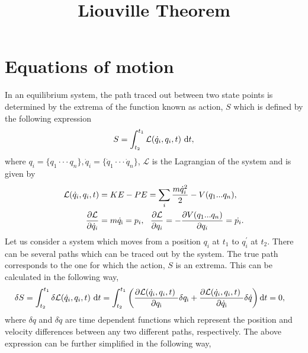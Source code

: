 \documentclass[a4paper]{article}
\title{Liouville Theorem}
\date{}
\begin{document}
\maketitle
\section{Equations of motion}
In an equilibrium system, the path traced out between two state points is determined by the extrema of the function known as action, $S$ which is defined by the following expression
\begin{equation}
S=\int^{t_{1}}_{t_{2}}\mathcal{L}(\dot{q}_{i},q_{i},t)~{\rm d}t,
\end{equation}
where $q_{i}=\{q_{1}\cdot\cdot\cdot q_{n}\},\dot{q}_{i}=\{\dot{q}_{1}\cdot\cdot\cdot \dot{q}_{n}\}$, $\mathcal{L}$ is the Lagrangian of the system and is given by
\begin{equation}\label{eq:lagrangian}
\begin{split}
\mathcal{L}(\dot{q}_{i},q_{i},t)&=KE-PE=\sum_{i}\frac{m\dot{q}_{i}^{2}}{2} - V(q_{1}...q_{n}),\\
\frac{\partial \mathcal{L}}{\partial \dot{q}_{i}}&=m\dot{q}_{\rm i}=p_{i},~~\frac{\partial \mathcal{L}}{\partial q_{i}}=-\frac{\partial V(q_{1}...q_{n})}{\partial q_{i}}=\dot{p_{i}}.
\end{split}
\end{equation}
Let us consider a system which moves from a position $q_{i}$ at $t_{1}$ to $q_{i}^{\prime}$ at $t_{2}$. There can be several paths which can be traced out by the system. The true path corresponds to the one for which the action, $S$ is an extrema. This can be calculated in the following way,
\begin{equation}
\begin{split}
\delta S&=\int^{t_{1}}_{t_{2}}\delta\mathcal{L}(\dot{q}_{i},q_{i},t)~{\rm d}t=\int^{t_{1}}_{t_{2}}\left(\frac{\partial\mathcal{L}(\dot{q}_{i},q_{i},t)~}{\partial q_{\rm i}}\delta q_{\rm i}+\frac{\partial\mathcal{L}(\dot{q}_{i},q_{i},t)~}{\partial \dot{q}_{\rm i}}\delta \dot{q}\right){\rm d}t=0,
\end{split}
\end{equation}
where $\delta q$ and $\delta \dot{q}$ are time dependent functions which represent the position and velocity differences between any two different paths, respectively.  The above expression can be further simplified in the following way,
\end{document}
